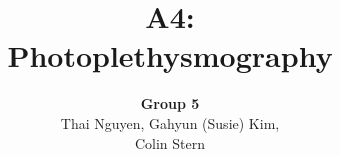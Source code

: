\documentclass[12pt]{article}
\begin{document}
 

\title{\textbf{A4: \\ Photoplethysmography}}%
\author{\textbf{Group 5}\\ %
Thai Nguyen, Gahyun (Susie) Kim, \\ Colin Stern} %
\vspace{-10mm}
\maketitle
 
 
\end{document}
